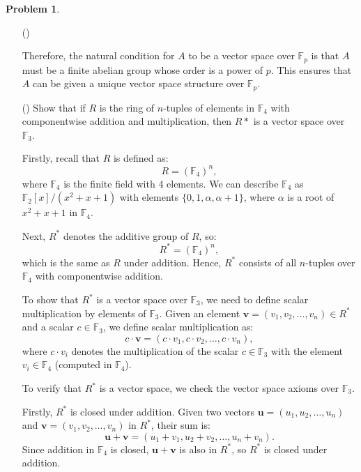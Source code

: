 \documentclass[12pt]{article}
\theoremstyle{definition}
\newtheorem{problem}{Problem}
\newcounter{subq}[problem]
\newenvironment{subproblem}
{\refstepcounter{subq} \begin{itemize} \item[(\alph{subq})]}
{\end{itemize} \medskip}
\begin{document}
\begin{problem}
\begin{subproblem}
\begin{solution}
            Therefore, the natural condition for \( A \) to be a vector space over \(\mathbb{F}_p\) is that \( A \) must be a finite abelian group whose order is a power of \( p \). This ensures that \( A \) can be given a unique vector space structure over \(\mathbb{F}_p\).

            
        \end{solution}
    \end{subproblem}

    \begin{subproblem}
        Show that if $R$ is the ring of $n$-tuples of elements in $\mathbb{F}_4$ with componentwise
        addition and multiplication, then $R*$ is a vector space over $\mathbb{F}_3$.

        \begin{solution}
            Firstly, recall that \( R \) is defined as:
            \[
            R = (\mathbb{F}_4)^n,
            \]
            where \( \mathbb{F}_4 \) is the finite field with 4 elements. We can describe \( \mathbb{F}_4 \) as \( \mathbb{F}_2[x]/(x^2 + x + 1) \) with elements \( \{0, 1, \alpha, \alpha + 1\} \), where \( \alpha \) is a root of \( x^2 + x + 1 \) in \( \mathbb{F}_4 \).

            Next, \( R^* \) denotes the additive group of \( R \), so:
            \[
            R^* = (\mathbb{F}_4)^n,
            \]
            which is the same as \( R \) under addition. Hence, \( R^* \) consists of all \( n \)-tuples over \( \mathbb{F}_4 \) with componentwise addition.

            To show that \( R^* \) is a vector space over \( \mathbb{F}_3 \), we need to define scalar multiplication by elements of \( \mathbb{F}_3 \). Given an element \( \mathbf{v} = (v_1, v_2, \ldots, v_n) \in R^* \) and a scalar \( c \in \mathbb{F}_3 \), we define scalar multiplication as:
            \[
            c \cdot \mathbf{v} = (c \cdot v_1, c \cdot v_2, \ldots, c \cdot v_n),
            \]
            where \( c \cdot v_i \) denotes the multiplication of the scalar \( c \in \mathbb{F}_3 \) with the element \( v_i \in \mathbb{F}_4 \) (computed in \( \mathbb{F}_4 \)).

            To verify that \( R^* \) is a vector space, we check the vector space axioms over \( \mathbb{F}_3 \).

            Firstly, \( R^* \) is closed under addition. Given two vectors \( \mathbf{u} = (u_1, u_2, \ldots, u_n) \) and \( \mathbf{v} = (v_1, v_2, \ldots, v_n) \) in \( R^* \), their sum is:
            \[
            \mathbf{u} + \mathbf{v} = (u_1 + v_1, u_2 + v_2, \ldots, u_n + v_n).
            \]
            Since addition in \( \mathbb{F}_4 \) is closed, \( \mathbf{u} + \mathbf{v} \) is also in \( R^* \), so \( R^* \) is closed under addition.


\end{solution}
\end{subproblem}
\end{problem}
\end{document}
